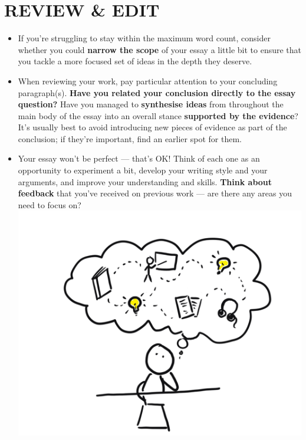 \documentclass[10pt,a4paper]{article}
\begin{document}
\begin{multicols}{2}
\begin{itemize}
\end{itemize}

\section*{REVIEW \& EDIT}


\begin{itemize}
\item If you’re struggling to stay within the maximum word count, consider whether you could \textbf{narrow the scope} of your essay a little bit to ensure that you tackle a more focused set of ideas in the depth they deserve.
\item When reviewing your work, pay particular attention to your concluding paragraph(s). \textbf{Have you related your conclusion directly to the essay question?} Have you managed to \textbf{synthesise ideas} from throughout the main body of the essay into an overall stance \textbf{supported by the evidence}? It’s usually best to avoid introducing new pieces of evidence as part of the conclusion; if they’re important, find an earlier spot for them.
\item Your essay won’t be perfect --- that’s OK! Think of each one as an opportunity to experiment a bit, develop your writing style and your arguments, and improve your understanding and skills. \textbf{Think about feedback} that you’ve received on previous work --- are there any areas you need to focus on?
\includegraphics[width=0.9\columnwidth]{cartoons/synthesise.png}
\end{itemize}





\end{multicols}
\end{document}
